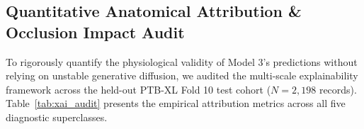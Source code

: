 \documentclass[5p,twocolumn,10pt]{elsarticle}
\begin{document}
\begin{table}[t]
\caption{10-Fold Stratified Cross-Validation Benchmark Results on PTB-XL. Mean $\pm$ Std [95\% CI] across 10 cyclic folds.}
\label{tab:10fold_results}
\centering
\small
\setlength{\tabcolsep}{4.5pt}
\end{table}

\subsection{Quantitative Anatomical Attribution \& Occlusion Impact Audit}
To rigorously quantify the physiological validity of Model 3's predictions without relying on unstable generative diffusion, we audited the multi-scale explainability framework across the held-out PTB-XL Fold 10 test cohort ($N = 2,198$ records). Table~\ref{tab:xai_audit} presents the empirical attribution metrics across all five diagnostic superclasses.
\end{document}
